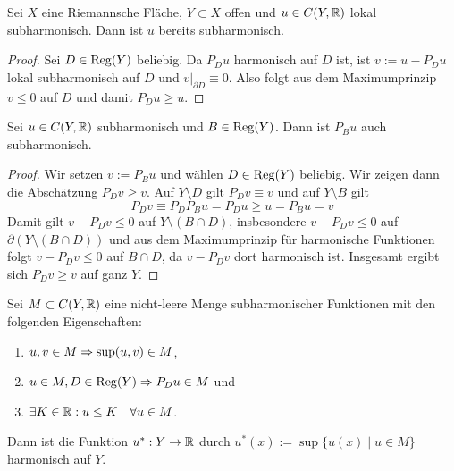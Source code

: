 \begin{cor}
  Sei $X$ eine Riemannsche Fläche, $Y\subset X$ offen und $u \in C(Y,
  \mathbb{R})$ lokal subharmonisch. Dann ist $u$ bereits subharmonisch.
\end{cor}

\begin{proof}
  Sei $D \in \operatorname{Reg}(Y)$ beliebig. Da $P_D u$ harmonisch auf $D$ ist, ist
  $v:= u- P_Du$ lokal subharmonisch auf $D$ und $v|_{\partial D}
  \equiv 0$. Also folgt aus dem Maximumprinzip $v \leq0$ auf $D$ und
  damit $P_Du \geq u$.
\end{proof}

\begin{lemma}
  Sei $u \in C(Y, \mathbb{R})$ subharmonisch und $B \in \operatorname{Reg}(Y)$. Dann ist
  $P_B u$ auch subharmonisch.
\end{lemma}

\begin{proof}
  Wir setzen $v:= P_B u$ und wählen $D \in \operatorname{Reg}(Y)$ beliebig. Wir
  zeigen dann die Abschätzung $P_D v \geq v$. Auf $Y \setminus D$ gilt $P_Dv \equiv v$
  und auf $Y\setminus B$ gilt
  \[
  P_Dv \equiv P_DP_Bu = P_Du \geq u = P_Bu = v
  \]
  Damit gilt $v - P_Dv \leq 0$ auf $Y \setminus (B \cap D)$,
  insbesondere $v- P_D v \leq 0$ auf $\partial (Y \setminus (B \cap
  D))$ und aus dem Maximumprinzip für harmonische Funktionen folgt $v
  - P_D v \leq 0$ auf $B \cap D$, da $v - P_D v$ dort harmonisch
  ist. Insgesamt ergibt sich $P_Dv \geq v$ auf ganz $Y$.
\end{proof}

\begin{lemma}[Perron]
  \label{lemma:perron}
  Sei $M \subset C(Y, \mathbb{R})$ eine nicht-leere Menge subharmonischer
  Funktionen mit den folgenden Eigenschaften:
  \begin{enumerate}
  \item $u,v \in M \Rightarrow \sup(u,v) \in M$,
  \item $u \in M, D \in \operatorname{Reg}(Y) \Rightarrow P_Du \in M$ und
  \item $\exists K \in \mathbb{R}: u \leq K \quad \forall u \in M$.
  \end{enumerate}
  Dann ist die Funktion $u^\ast : Y \rightarrow \mathbb{R}$ durch $u^\ast(x) :=
  \sup\{u(x) \mid u \in M \}$ harmonisch auf $Y$.
\end{lemma}


